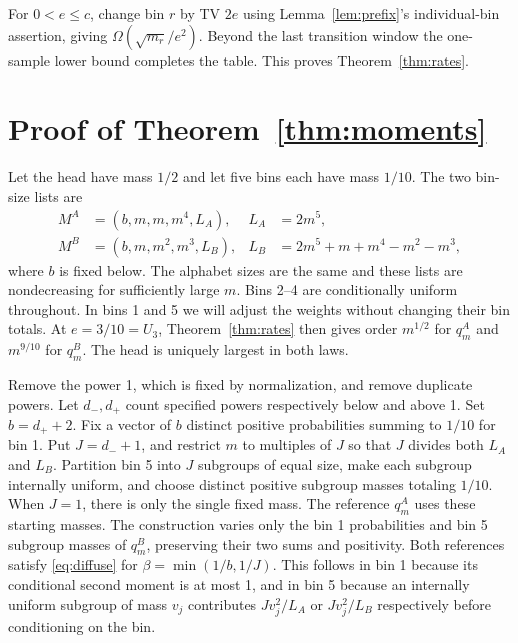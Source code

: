 \documentclass[11pt]{article}
\begin{document}
For \(0<e\le c\), change bin \(r\) by TV \(2e\) using Lemma~\ref{lem:prefix}'s individual-bin assertion, giving \(\Omega(\sqrt{m_r}/e^2)\). Beyond the last transition window the one-sample lower bound completes the table. This proves Theorem~\ref{thm:rates}.

\section{Proof of Theorem~\ref{thm:moments}}

Let the head have mass \(1/2\) and let five bins each have mass \(1/10\). The two bin-size lists are
\begin{align*}
 M^A&=(b,m,m,m^4,L_A), &L_A&=2m^5,\\
 M^B&=(b,m,m^2,m^3,L_B), &L_B&=2m^5+m+m^4-m^2-m^3,
\end{align*}
where \(b\) is fixed below. The alphabet sizes are the same and these lists are nondecreasing for sufficiently large \(m\). Bins 2--4 are conditionally uniform throughout. In bins 1 and 5 we will adjust the weights without changing their bin totals. At \(e=3/10=U_3\), Theorem~\ref{thm:rates} then gives order \(m^{1/2}\) for \(q_m^A\) and \(m^{9/10}\) for \(q_m^B\). The head is uniquely largest in both laws.

Remove the power 1, which is fixed by normalization, and remove duplicate powers. Let \(d_-,d_+\) count specified powers respectively below and above 1. Set \(b=d_++2\). Fix a vector of \(b\) distinct positive probabilities summing to \(1/10\) for bin 1. Put \(J=d_-+1\), and restrict \(m\) to multiples of \(J\) so that \(J\) divides both \(L_A\) and \(L_B\). Partition bin 5 into \(J\) subgroups of equal size, make each subgroup internally uniform, and choose distinct positive subgroup masses totaling \(1/10\). When \(J=1\), there is only the single fixed mass. The reference \(q_m^A\) uses these starting masses. The construction varies only the bin 1 probabilities and bin 5 subgroup masses of \(q_m^B\), preserving their two sums and positivity. Both references satisfy \eqref{eq:diffuse} for \(\beta=\min(1/b,1/J)\). This follows in bin 1 because its conditional second moment is at most 1, and in bin 5 because an internally uniform subgroup of mass \(v_j\) contributes \(Jv_j^2/L_A\) or \(Jv_j^2/L_B\) respectively before conditioning on the bin.
\end{document}
